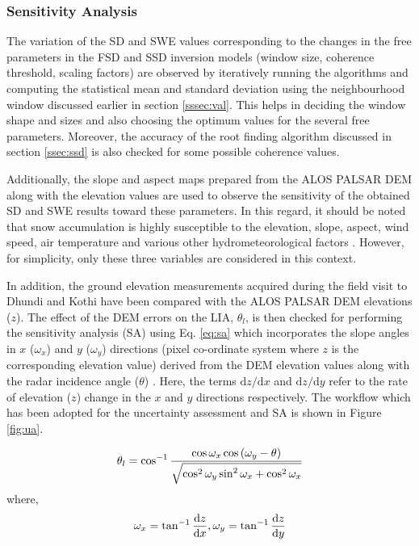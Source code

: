 \documentclass[review]{elsarticle}
\numberwithin{equation}{section}
\numberwithin{figure}{section}
\numberwithin{table}{section}
\begin{document}
\subsubsection{Sensitivity Analysis}
\label{sssec:sa}

The variation of the SD and SWE values corresponding to the changes in the free parameters in the FSD and SSD inversion models (window size, coherence threshold, scaling factors) are observed by iteratively running the algorithms and computing the statistical mean and standard deviation using the neighbourhood window discussed earlier in section \ref{sssec:val}. This helps in deciding the window shape and sizes and also choosing the optimum values for the several free parameters. Moreover, the accuracy of the root finding algorithm discussed in section \ref{ssec:ssd} is also checked for some possible coherence values.

Additionally, the slope and aspect maps prepared from the ALOS PALSAR DEM along with the elevation values are used to observe the sensitivity of the obtained SD and SWE results toward these parameters. In this regard, it should be noted that snow accumulation is highly susceptible to the elevation, slope, aspect, wind speed, air temperature and various other hydrometeorological factors \citep{Anderton2004, Grunewald2014, Thakur2012, Zheng2016}. However, for simplicity, only these three variables are considered in this context.

In addition, the ground elevation measurements acquired during the field visit to Dhundi and Kothi have been compared with the ALOS PALSAR DEM elevations ($z$). The effect of the DEM errors on the LIA, $\theta_l$, is then checked for performing the sensitivity analysis (SA) using Eq. \eqref{eq:sa} which incorporates the slope angles in $x$ ($\omega_x$) and $y$ ($\omega_y$) directions (pixel co-ordinate system where $z$ is the corresponding elevation value) derived from the DEM elevation values along with the radar incidence angle ($\theta$) \citep{Lee2000, Lee2009}. Here, the terms $\mathrm{d}z/\mathrm{d}x$ and $\mathrm{d}z/\mathrm{d}y$ refer to the rate of elevation ($z$) change in the $x$ and $y$ directions respectively. The workflow which has been adopted for the uncertainty assessment and SA is shown in Figure \ref{fig:ua}.

\begin{equation}
    \centering
    \label{eq:sa}
    \theta_l = \cos^{-1}\frac{\cos\omega_x\cos\left(\omega_y - \theta\right)}{\sqrt{\cos^2\omega_y\sin^2\omega_x + \cos^2\omega_x}}
\end{equation}
where, 
\begin{equation*}
    \centering
    \omega_x = \tan^{-1}\frac{\mathrm{d}z}{\mathrm{d}x}, \omega_y = \tan^{-1}\frac{\mathrm{d}z}{\mathrm{d}y}
\end{equation*}
\end{document}
